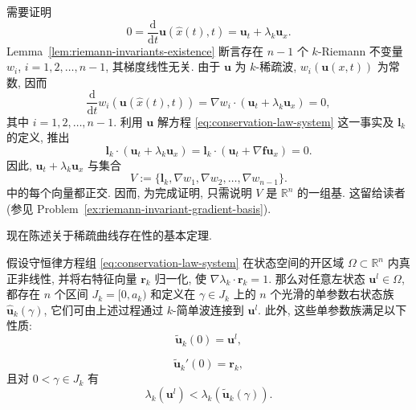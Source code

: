 \begin{Proof}
需要证明
\begin{equation}\label{eq:rarefaction-constant-along-characteristics}
0=\dfrac{\mathrm{d}}{\mathrm{d}t}\bm{u}(\hat x(t),t)=\bm{u}_t+\lambda_k\bm{u}_x.
\end{equation}
Lemma~\ref{lem:riemann-invariants-existence} 断言存在 $n-1$ 个 $k$-Riemann 不变量 $w_i$, $i=1,2,\ldots,n-1$, 其梯度线性无关. 由于 $\bm{u}$ 为 $k$-稀疏波, $w_i(\bm{u}(x,t))$ 为常数, 因而
\begin{equation}\label{eq:rarefaction-invariant-directional-derivatives}
\dfrac{\mathrm{d}}{\mathrm{d}t}w_i(\bm{u}(\hat x(t),t))=\nabla w_i\cdot(\bm{u}_t+\lambda_k\bm{u}_x)=0,
\end{equation}
其中 $i=1,2,\ldots,n-1$. 利用 $\bm{u}$ 解方程 \eqref{eq:conservation-law-system} 这一事实及 $\bm{l}_k$ 的定义, 推出
\begin{equation}\label{eq:rarefaction-left-eigenvector-identity}
\bm{l}_k\cdot(\bm{u}_t+\lambda_k\bm{u}_x)=\bm{l}_k\cdot(\bm{u}_t+\nabla\bm{f}\bm{u}_x)=0.
\end{equation}
因此, $\bm{u}_t+\lambda_k\bm{u}_x$ 与集合
\begin{equation}\label{eq:rarefaction-invariant-gradient-basis}
V:=\{\bm{l}_k,\nabla w_1,\nabla w_2,\ldots,\nabla w_{n-1}\}.
\end{equation}
中的每个向量都正交. 因而, 为完成证明, 只需说明 $V$ 是 $\mathbb{R}^n$ 的一组基. 这留给读者 (参见 Problem~\ref{ex:riemann-invariant-gradient-basis}).
\end{Proof}

现在陈述关于稀疏曲线存在性的基本定理.

\begin{Theorem}
\label{thm:rarefaction-curves-existence}
假设守恒律方程组 \eqref{eq:conservation-law-system} 在状态空间的开区域 $\Omega\subset\mathbb{R}^n$ 内真正非线性, 并将右特征向量 $\bm{r}_k$ 归一化, 使 $\nabla\lambda_k\cdot\bm{r}_k=1$. 那么对任意左状态 $\bm{u}^l\in\Omega$, 都存在 $n$ 个区间 $J_k=[0,a_k)$ 和定义在 $\gamma\in J_k$ 上的 $n$ 个光滑的单参数右状态族 $\hat{\bm{u}}_k(\gamma)$, 它们可由上述过程通过 $k$-简单波连接到 $\bm{u}^l$. 此外, 这些单参数族满足以下性质:
\begin{equation}\label{eq:rarefaction-curve-base-state}
\tilde{\bm{u}}_k(0)=\bm{u}^l,
\end{equation}

\begin{equation}\label{eq:rarefaction-curve-initial-tangent}
\tilde{\bm{u}}_k'(0)=\bm{r}_k,
\end{equation}
且对 $0<\gamma\in J_k$ 有
\begin{equation}\label{eq:rarefaction-curve-increasing-speed}
\lambda_k(\bm{u}^l)<\lambda_k(\tilde{\bm{u}}_k(\gamma)).
\end{equation}

\end{Theorem}

